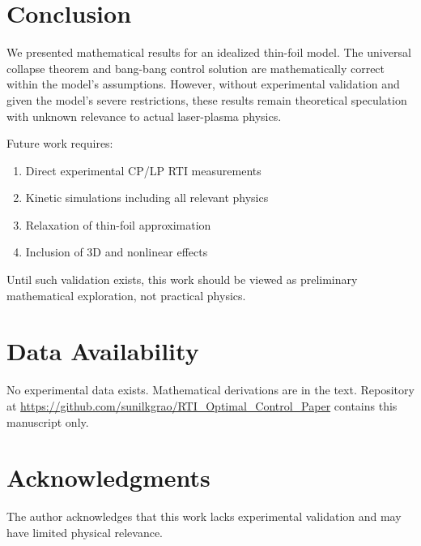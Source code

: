 \documentclass[aps,pre,twocolumn,showpacs,superscriptaddress]{revtex4-2}
\begin{document}
\section{Conclusion}

We presented mathematical results for an idealized thin-foil model. The universal collapse theorem and bang-bang control solution are mathematically correct within the model's assumptions. However, without experimental validation and given the model's severe restrictions, these results remain theoretical speculation with unknown relevance to actual laser-plasma physics.

Future work requires:
\begin{enumerate}
\item Direct experimental CP/LP RTI measurements
\item Kinetic simulations including all relevant physics
\item Relaxation of thin-foil approximation
\item Inclusion of 3D and nonlinear effects
\end{enumerate}

Until such validation exists, this work should be viewed as preliminary mathematical exploration, not practical physics.

\section*{Data Availability}
No experimental data exists. Mathematical derivations are in the text. Repository at \url{https://github.com/sunilkgrao/RTI_Optimal_Control_Paper} contains this manuscript only.

\section*{Acknowledgments}
The author acknowledges that this work lacks experimental validation and may have limited physical relevance.


\end{document}

